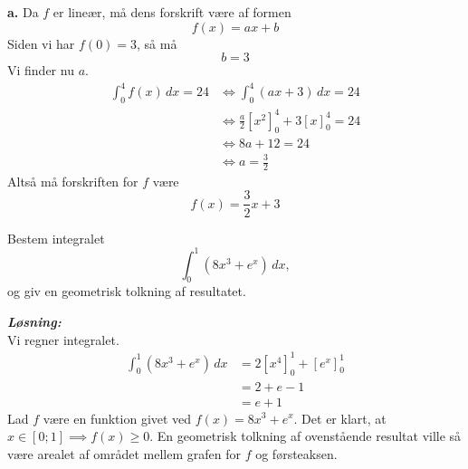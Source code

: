 \documentclass{article}
\newcommand{\sol}{\setlength{\parindent}{0cm}\textbf{\textit{Løsning:}}\setlength{\parindent}{1cm}}
\begin{document}
\textbf{a.}
Da $f$ er lineær, må dens forskrift være af formen
\[
f(x)= ax+b
\] 
Siden vi har $f(0)= 3$, så må 
\[
b=3
\] 
Vi finder nu $a$.
\begin{equation*}
\begin{split}
  \int_{0}^{4} f(x) \,dx =24 &\iff \int_{0}^{4} (ax+3) \,dx =24\\ 
  &\iff \frac{a}{2}\left[x^2\right]_{0}^4+3\left[x\right]_{0}^4=24\\ 
  &\iff 8a+12=24\\ 
  &\iff a=\frac{3}{2}
\end{split}
\end{equation*}
Altså må forskriften for $f$ være
\[
f(x)= \frac{3}{2}x+3
\] 
\begin{question}{}{}
  Bestem integralet
  \[
  \int_{0}^{1} \left(8x^3+ e^{x} \right)  \,dx,
  \] 
  og giv en geometrisk tolkning af resultatet.
\end{question}
\sol \\
Vi regner integralet.
\begin{equation*}
\begin{split}
  \int_{0}^{1} \left(8x^3+ e^{x} \right)  \,dx &= 2\left[x^4\right]_{0}^1 + \left[e^{x} \right]_{0}^1\\
  &=2+e-1\\ 
  &=e+1
\end{split}
\end{equation*}
Lad $f$ være en funktion givet ved $f(x)= 8x^3+e^{x} $.
Det er klart, at $x \in [0;1] \implies f(x)\geq0$.
En geometrisk tolkning af ovenstående resultat ville så være arealet af området mellem grafen for $f$ og førsteaksen. 
\end{document}
